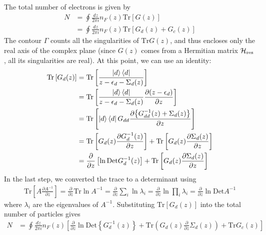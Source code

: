 \documentclass[12pt,twoside]{article}
\numberwithin{equation}{section}
\begin{document}
The total number of electrons is given by
\begin{equation}\begin{aligned}
	N &= \oint \frac{dz}{2\pi i}n_F(z) \text{Tr}\left[G(z) \right]\\
	  &= \oint \frac{dz}{2\pi i}n_F(z) \text{Tr}\left[G_{d}(z) + G_c(z)\right]
\end{aligned}\end{equation}
The contour \(\Gamma\) counts all the singularities of \(\text{Tr} G(z)\), and thus encloses only the real axis of the complex plane (since \(G(z)\) comes from a Hermitian matrix \(\mathcal{H}_\text{res}\), all its singularities are real).
At this point, we can use an identity:
\begin{equation}\begin{aligned}
	\text{Tr}\left[G_{d}(z)\right] &= \text{Tr}\left[ \frac{\ket{d}\bra{d}}{z - \epsilon_d - \Sigma_d(z)}\right]\\
				       &= \text{Tr}\left[ \frac{\ket{d}\bra{d}}{z - \epsilon_d - \Sigma_d(z)}\frac{\partial{\left(z - \epsilon_d\right)}}{\partial{z}} \right]\\
				       &= \text{Tr}\left[ \ket{d}\bra{d}G_{dd}\frac{\partial{\left\{G_{dd}^{-1}(z) + \Sigma_d(z)\right\}}}{\partial{z}} \right]\\
				       &= \text{Tr}\left[ G_{d}(z)\frac{\partial{G_{d}^{-1}(z)}}{\partial{z}} \right] + \text{Tr}\left[ G_{d}(z)\frac{\partial{\Sigma_d(z)}}{\partial{z}} \right]\\
				       &= \frac{\partial{}}{\partial{z}}\left[\ln \text{Det}G_{d}^{-1}(z)\right] + \text{Tr}\left[ G_{d}(z)\frac{\partial{\Sigma_d(z)}}{\partial{z}} \right]\\
\end{aligned}\end{equation}
In the last step, we converted the trace to a determinant using
\begin{equation}\begin{aligned}
	\text{Tr}\left[A \frac{\partial{A^{-1}}}{\partial{z}}\right] = \frac{\partial{}}{\partial{z}}\text{Tr}\ln A^{-1} =\frac{\partial{}}{\partial{z}}\sum_i \ln \lambda_i = \frac{\partial{}}{\partial{z}}\ln \prod_i \lambda_i = \frac{\partial{}}{\partial{z}}\ln \text{Det}A^{-1}
\end{aligned}\end{equation}
where \(\lambda_i\) are the eigenvalues of \(A^{-1}\). Substituting \(\text{Tr}\left[G_d(z)\right] \) into the total number of particles gives
\begin{equation}\begin{aligned}
	N  &= \oint \frac{dz}{2\pi i}n_F(z) \left[\frac{\partial{}}{\partial{z}} \ln \text{Det} \left\{G^{-1}_d(z)\right\} + \text{Tr} \left( G_d(z) \frac{\partial{}}{\partial{z}}\Sigma_d(z) \right) + \text{Tr}G_c(z)\right]
\end{aligned}\end{equation}
\end{document}
